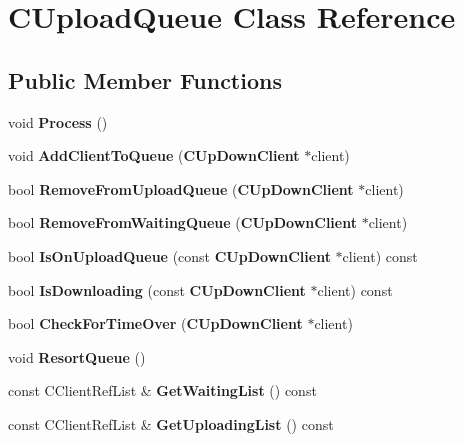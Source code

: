 \section{CUploadQueue Class Reference}
\label{classCUploadQueue}
\subsection*{Public Member Functions}
\begin{DoxyCompactItemize}
\item 
void {\bfseries Process} ()\label{classCUploadQueue_a483a21f46df5fa539f9601640ab30a02}

\item 
void {\bfseries AddClientToQueue} ({\bf CUpDownClient} $\ast$client)\label{classCUploadQueue_ad382d30d4b75b69f9b419164ac7f1725}

\item 
bool {\bfseries RemoveFromUploadQueue} ({\bf CUpDownClient} $\ast$client)\label{classCUploadQueue_a3d9050b97902362414b2a154fd1b47d6}

\item 
bool {\bfseries RemoveFromWaitingQueue} ({\bf CUpDownClient} $\ast$client)\label{classCUploadQueue_ad885e3ebf18a02bfc5644d0e6ea088de}

\item 
bool {\bfseries IsOnUploadQueue} (const {\bf CUpDownClient} $\ast$client) const \label{classCUploadQueue_a6d323ffb2707786f661195d693692a48}

\item 
bool {\bfseries IsDownloading} (const {\bf CUpDownClient} $\ast$client) const \label{classCUploadQueue_a6593580d226ce8c27377fdb7b63c83c9}

\item 
bool {\bfseries CheckForTimeOver} ({\bf CUpDownClient} $\ast$client)\label{classCUploadQueue_a59c86de6e6f5a447a08b04b4940c537d}

\item 
void {\bfseries ResortQueue} ()\label{classCUploadQueue_a968956a910e39b2024dc46b2c01af4fd}

\item 
const CClientRefList \& {\bfseries GetWaitingList} () const \label{classCUploadQueue_a41954e8abe946e2b0e38c40ac6f67b4d}

\item 
const CClientRefList \& {\bfseries GetUploadingList} () const \label{classCUploadQueue_a6fb138d8f655e8cd6a7a9f52fb875e07}


\end{DoxyCompactItemize}
